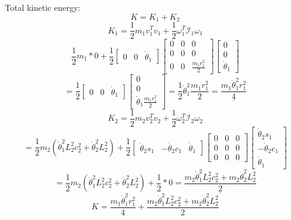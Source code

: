 \documentclass[12pt,norsk,a4paper]{article}
\begin{document}
    Total kinetic energy:\\
    \[K = K_1+K_2\]
    \[K_1 = \frac{1}{2}m_1v_1^Tv_1 + \frac{1}{2}\omega_1^T\mathcal{I}_1\omega_1\]
    \[\frac{1}{2}m_1*0 + \frac{1}{2}
                                            \left[\begin{array}{ccc}0&0&\dot\theta_1\end{array}\right]
                                            \left[\begin{array}{ccc}0&0&0\\0&0&0\\0&0&\frac{m_1r_1^2}{2}\end{array}\right]
                                            \left[\begin{array}{c}0\\0\\\dot\theta_1\end{array}\right]\]
    \[= \frac{1}{2}
                    \left[\begin{array}{ccc}0&0&\dot\theta_1\end{array}\right]
                    \left[\begin{array}{c}0\\0\\\dot\theta_1\frac{m_1r_1^2}{2}\end{array}\right]
    = \frac{1}{2}\dot\theta_1^2\frac{m_1r_1^2}{2} = \underline{\frac{m_1\dot\theta_1^2r_1^2}{4}}\]
    \vspace{5mm}
    \[K_2 = \frac{1}{2}m_2v_2^Tv_2 + \frac{1}{2}\omega_2^T\mathcal{I}_2\omega_2\]
    \[= \frac{1}{2}m_2(\dot\theta_1^2L_2^2c_2^2+\dot\theta_2^2L_2^2) + \frac{1}{2}
                                                                    \left[\begin{array}{ccc}\dot\theta_2s_1&-\dot\theta_2c_1&\dot\theta_1\end{array}\right]
                                                                    \left[\begin{array}{ccc}0&0&0\\0&0&0\\0&0&0\end{array}\right]
                                                                    \left[\begin{array}{c}\dot\theta_2s_1\\-\dot\theta_2c_1\\\dot\theta_1\end{array}\right]\]
    \[= \frac{1}{2}m_2(\dot\theta_1^2L_2^2c_2^2+\dot\theta_2^2L_2^2) + \frac{1}{2}*0 = \underline{\frac{m_2\dot\theta_1^2L_2^2c_2^2+m_2\dot\theta_2^2L_2^2}{2}}\]
  \vspace{5mm}
    \[K = \frac{m_1\dot\theta_1^2r_1^2}{4} + \frac{m_2\dot\theta_1^2L_2^2c_2^2+m_2\dot\theta_2^2L_2^2}{2}\]
\end{document}
